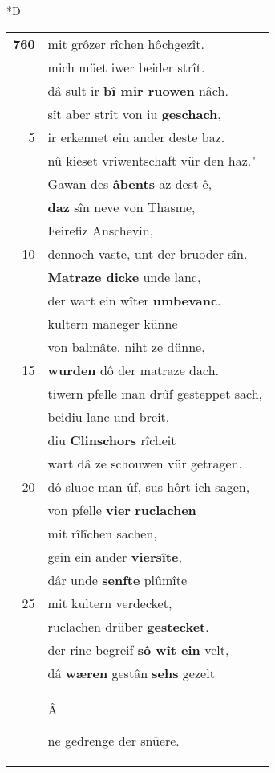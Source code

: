 \documentclass[8pt,a4paper,notitlepage]{article}
\begin{document}
\begin{table}[ht]
\begin{minipage}[t]{0.5\linewidth}
\small
\begin{center}*D
\end{center}
\begin{tabular}{rl}
\textbf{760} & mit grôzer rîchen hôchgezît.\\ 
 & mich müet iwer beider strît.\\ 
 & dâ sult ir \textbf{bî mir ruowen} nâch.\\ 
 & sît aber strît von iu \textbf{geschach},\\ 
5 & ir erkennet ein ander deste baz.\\ 
 & nû kieset vriwentschaft vür den haz."\\ 
 & Gawan des \textbf{âbents} az dest ê,\\ 
 & \textbf{daz} sîn neve von Thasme,\\ 
 & Feirefiz Anschevin,\\ 
10 & dennoch vaste, unt der bruoder sîn.\\ 
 & \textbf{Matraze dicke} unde lanc,\\ 
 & der wart ein wîter \textbf{umbevanc}.\\ 
 & kultern maneger künne\\ 
 & von balmâte, niht ze dünne,\\ 
15 & \textbf{wurden} dô der matraze dach.\\ 
 & tiwern pfelle man drûf gesteppet sach,\\ 
 & beidiu lanc und breit.\\ 
 & diu \textbf{Clinschors} rîcheit\\ 
 & wart dâ ze schouwen vür getragen.\\ 
20 & dô sluoc man ûf, sus hôrt ich sagen,\\ 
 & von pfelle \textbf{vier} \textbf{ruclachen}\\ 
 & mit rîlîchen sachen,\\ 
 & gein ein ander \textbf{viersîte},\\ 
 & dâr unde \textbf{senfte} plûmîte\\ 
25 & mit kultern verdecket,\\ 
 & ruclachen drüber \textbf{gestecket}.\\ 
 & der rinc begreif \textbf{sô wît ein} velt,\\ 
 & dâ \textbf{wæren} gestân \textbf{sehs} gezelt\\ 
 & \begin{large}Â\end{large}ne gedrenge der snüere.\\ 

\end{tabular}
\end{minipage}
\end{table}
\end{document}
